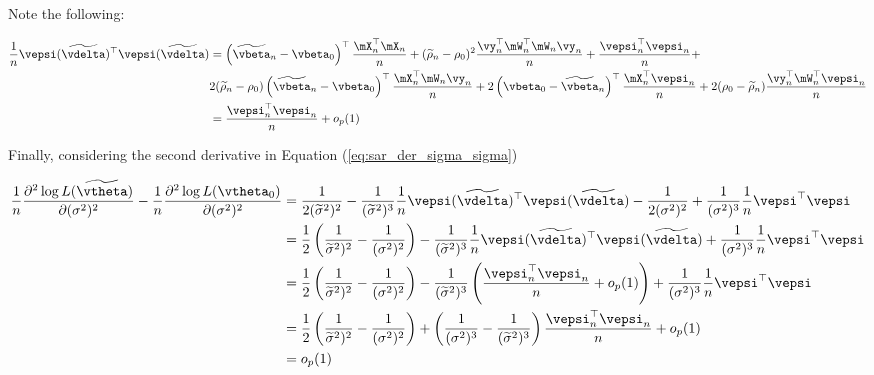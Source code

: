 \begin{subappendices}
\begin{enumerate}
    Note the following:
   
   \begin{equation*}
    \begin{aligned}
    \frac{1}{n}\vepsi(\widetilde{\vdelta})^\top \vepsi(\widetilde{\vdelta}) & = \left(\widetilde{\vbeta}_n - \vbeta_0\right)^\top\frac{\mX_n^\top\mX_n}{n} + (\widetilde{\rho}_n -\rho_0)^2\frac{\vy_n^\top\mW_n^\top\mW_n\vy_n}{n} + \frac{\vepsi_n^{\top}\vepsi_n}{n} + \\
    & 2(\widetilde{\rho}_n -\rho_0)\left(\widetilde{\vbeta}_n - \vbeta_0\right)^\top\frac{\mX_n^\top\mW_n\vy_n}{n} + 2\left(\vbeta_0-\widetilde{\vbeta}_n\right)^\top\frac{\mX_n^\top\vepsi_n}{n} + 2(\rho_0-\widetilde{\rho}_n)\frac{\vy_n^\top\mW_n^\top\vepsi_n}{n} \\
    & = \frac{\vepsi_n^{\top}\vepsi_n}{n} + o_p(1)
    \end{aligned}
   \end{equation*}
   
   
   Finally, considering the second derivative in Equation (\ref{eq:sar_der_sigma_sigma})
   
   \begin{equation*}
    \begin{aligned}
      \frac{1}{n}\frac{\partial^2 \log L(\widetilde{\vtheta})}{\partial (\sigma^2)^2} -	\frac{1}{n}\frac{\partial^2 \log L(\vtheta_0)}{\partial (\sigma^2)^2}  & = \frac{1}{2(\widetilde{\sigma}^2) ^2} - \frac{1}{(\widetilde{\sigma}^2)^3} \frac{1}{n}\vepsi(\widetilde{\vdelta})^\top \vepsi(\widetilde{\vdelta}) -\frac{1}{2(\sigma^2) ^2} + \frac{1}{(\sigma^2)^3} \frac{1}{n}\vepsi^\top \vepsi \\
      & = \frac{1}{2}\left(\frac{1}{\widetilde{\sigma}^2) ^2}-\frac{1}{(\sigma^2) ^2}\right)- \frac{1}{(\widetilde{\sigma}^2)^3} \frac{1}{n}\vepsi(\widetilde{\vdelta})^\top \vepsi(\widetilde{\vdelta}) + \frac{1}{(\sigma^2)^3} \frac{1}{n}\vepsi^\top \vepsi \\
      & = \frac{1}{2}\left(\frac{1}{\widetilde{\sigma}^2) ^2}-\frac{1}{(\sigma^2) ^2}\right)- \frac{1}{(\widetilde{\sigma}^2)^3} \left(\frac{\vepsi_n^{\top}\vepsi_n}{n} + o_p(1)\right)+ \frac{1}{(\sigma^2)^3} \frac{1}{n}\vepsi^\top \vepsi \\
      & = \frac{1}{2}\left(\frac{1}{\widetilde{\sigma}^2) ^2}-\frac{1}{(\sigma^2) ^2}\right)+ \left(\frac{1}{(\sigma^2)^3} -\frac{1}{(\widetilde{\sigma}^2)^3}\right)\frac{\vepsi_n^{\top}\vepsi_n}{n} + o_p(1) \\
      & = o_p(1)
    \end{aligned}
   \end{equation*}
   


\end{enumerate}
\end{subappendices}
